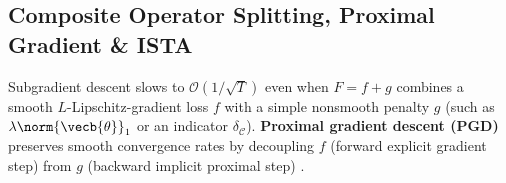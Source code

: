 \documentclass[../../../../master.tex]{subfiles}
\begin{document}
\subsection{Composite Operator Splitting, Proximal Gradient \& ISTA}
\label{sec:sgd:proximal}

Subgradient descent slows to $\mathcal{O}(1/\sqrt{T})$ even when $F = f + g$ combines a smooth $L$-Lipschitz-gradient loss $f$ with a simple nonsmooth penalty $g$ (such as $\lambda\norm{\vecb{\theta}}_1$ or an indicator $\delta_{\mathcal{C}}$). \textbf{Proximal gradient descent (PGD)} preserves smooth convergence rates by decoupling $f$ (forward explicit gradient step) from $g$ (backward implicit proximal step)  .
\end{document}

